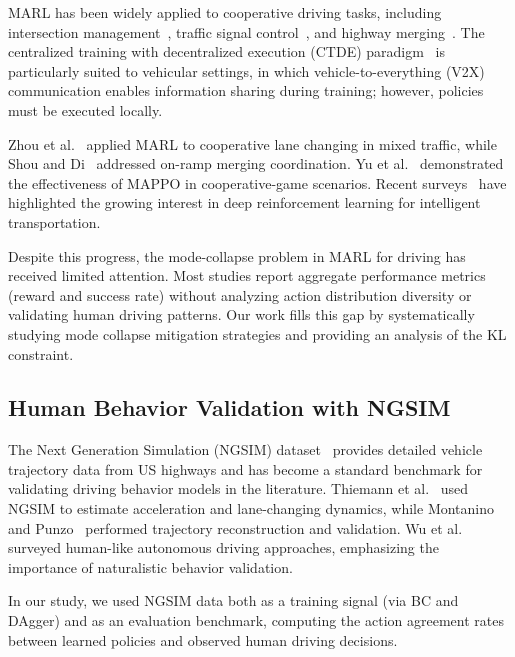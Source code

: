 \documentclass[journal]{IEEEtran}
\begin{document}
MARL has been widely applied to cooperative driving tasks, including intersection management~\cite{chen2020cooperative}, traffic signal control~\cite{chu2019multi}, and highway merging~\cite{shou2020multi,letter2019efficient}.
The centralized training with decentralized execution (CTDE) paradigm~\cite{lowe2017multi,rashid2018qmix} is particularly suited to vehicular settings, in which vehicle-to-everything (V2X) communication enables information sharing during training; however, policies must be executed locally.

Zhou et al.~\cite{zhou2020multi} applied MARL to cooperative lane changing in mixed traffic, while Shou and Di~\cite{shou2020multi} addressed on-ramp merging coordination.
Yu et al.~\cite{yu2022surprising} demonstrated the effectiveness of MAPPO in cooperative-game scenarios.
Recent surveys~\cite{haydari2020deep,li2023reinforcement} have highlighted the growing interest in deep reinforcement learning for intelligent transportation.

Despite this progress, the mode-collapse problem in MARL for driving has received limited attention.
Most studies report aggregate performance metrics (reward and success rate) without analyzing action distribution diversity or validating human driving patterns.
Our work fills this gap by systematically studying mode collapse mitigation strategies and providing an analysis of the KL constraint.

\subsection{Human Behavior Validation with NGSIM}

The Next Generation Simulation (NGSIM) dataset~\cite{ngsim2006,colyar2007us} provides detailed vehicle trajectory data from US highways and has become a standard benchmark for validating driving behavior models in the literature.
Thiemann et al.~\cite{thiemann2008estimating} used NGSIM to estimate acceleration and lane-changing dynamics, while Montanino and Punzo~\cite{montanino2015trajectory} performed trajectory reconstruction and validation.
Wu et al.~\cite{wu2023human} surveyed human-like autonomous driving approaches, emphasizing the importance of naturalistic behavior validation.

In our study, we used NGSIM data both as a training signal (via BC and DAgger) and as an evaluation benchmark, computing the action agreement rates between learned policies and observed human driving decisions.
\end{document}
